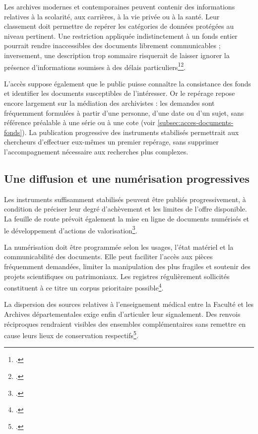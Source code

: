 Les archives modernes et contemporaines peuvent contenir des informations relatives à la scolarité, aux carrières, à la vie privée ou à la santé. Leur classement doit permettre de repérer les catégories de données protégées au niveau pertinent. Une restriction appliquée indistinctement à un fonds entier pourrait rendre inaccessibles des documents librement communicables ; inversement, une description trop sommaire risquerait de laisser ignorer la présence d'informations soumises à des délais particuliers\footcite{Bastien1996DroitArchives}\footcite{Foissey2017Juristes}.

L'accès suppose également que le public puisse connaître la consistance des fonds et identifier les documents susceptibles de l'intéresser. Or le repérage repose encore largement sur la médiation des archivistes : les demandes sont fréquemment formulées à partir d'une personne, d'une date ou d'un sujet, sans référence préalable à une série ou à une cote (voir \cref{subsec:acces-documents-fonds}). La publication progressive des instruments stabilisés permettrait aux chercheurs d'effectuer eux-mêmes un premier repérage, sans supprimer l'accompagnement nécessaire aux recherches plus complexes.

\subsection{Une diffusion et une numérisation progressives}

Les instruments suffisamment stabilisés peuvent être publiés progressivement, à condition de préciser leur degré d'achèvement et les limites de l'offre disponible. La feuille de route prévoit également la mise en ligne de documents numérisés et le développement d'actions de valorisation\footcite{AHFMFeuilleRoute2025_2029}.

La numérisation doit être programmée selon les usages, l'état matériel et la communicabilité des documents. Elle peut faciliter l'accès aux pièces fréquemment demandées, limiter la manipulation des plus fragiles et soutenir des projets scientifiques ou patrimoniaux. Les registres régulièrement sollicités constituent à ce titre un corpus prioritaire possible\footcite{AHFMComitePilotage2026}.

La dispersion des sources relatives à l'enseignement médical entre la Faculté et les Archives départementales exige enfin d'articuler leur \gls{signalement}. Des renvois réciproques rendraient visibles des ensembles complémentaires sans remettre en cause leurs lieux de conservation respectifs\footcite{AHFMComitePilotage2026}.

